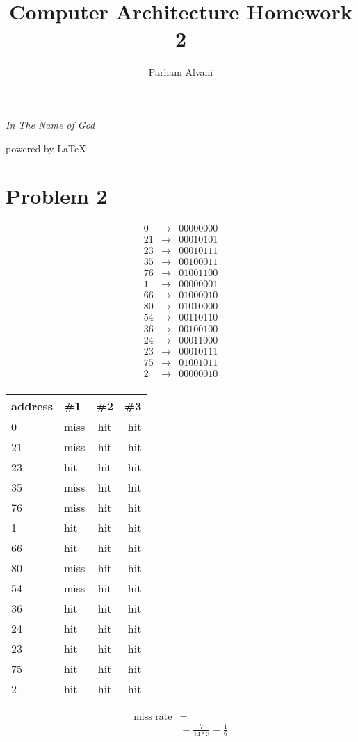 \documentclass[11pt]{article}
\author{Parham Alvani}
\title{Computer Architecture Homework 2}
\begin{document}
\begin{titlepage}
\begin{center}
\emph{In The Name of God}
\end{center}
\maketitle
\begin{center}
powered by \LaTeX
\end{center}
\end{titlepage}
\tableofcontents
\newpage
\section{Problem 2}
\begin{align*}
	0& \rightarrow &0000 0000 \\
	21& \rightarrow &0001 0101 \\
	23& \rightarrow &0001 0111 \\
	35& \rightarrow &0010 0011 \\
	76& \rightarrow &0100 1100 \\
	1& \rightarrow  &0000 0001 \\
	66& \rightarrow &0100 0010 \\
	80& \rightarrow &0101 0000 \\
	54& \rightarrow &0011 0110 \\
	36& \rightarrow &0010 0100 \\
	24& \rightarrow &0001 1000 \\
	23& \rightarrow &0001 0111 \\
	75& \rightarrow &0100 1011 \\
	2& \rightarrow &0000 0010 \\
\end{align*}
\begin{center}
	\begin{tabular}{l || l | c | r}
		address & \#1 & \#2 & \#3 \\
		\hline
		0  & miss & hit & hit \\
		21 & miss & hit & hit \\
		23 & hit  & hit & hit \\
		35 & miss & hit & hit \\
		76 & miss & hit & hit \\
		1  & hit  & hit & hit \\
		66 & hit  & hit & hit \\
		80 & miss & hit & hit \\
		54 & miss & hit & hit \\
		36 & hit  & hit & hit \\
		24 & hit  & hit & hit \\
		23 & hit  & hit & hit \\
		75 & hit  & hit & hit \\
		2  & hit  & hit & hit \\
	\end{tabular}
\end{center}
\begin{align*}
	\text{miss rate} &= \\
	&= \frac{7}{14 * 3} = \frac{1}{6} \\
\end{align*}
\end{document}
